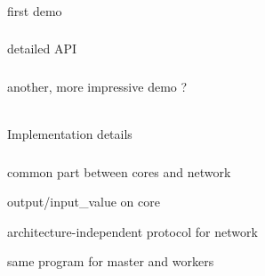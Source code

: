 \documentclass{beamer}
\let\emph\alert
\begin{document}
\begin{frame}\frametitle{}
  first demo
\end{frame}

\begin{frame}\frametitle{}
  detailed API
\end{frame}

\begin{frame}\frametitle{}
  another, more impressive demo ?
\end{frame}

\begin{frame}
  \begin{center}
    \hrulefill\\
    \emph{Implementation details}
  \end{center}
\end{frame}

\begin{frame}\frametitle{}
  common part between cores and network

  output/input\_value on core

  architecture-independent protocol for network

  same program for master and workers
\end{frame}
\end{document}
